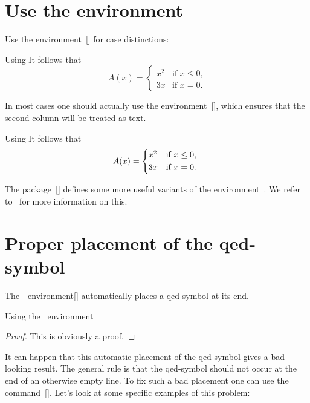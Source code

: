 \section{Use the  environment}

Use the environment~[\envname] for case distinctions:
\begin{showlatex}{Using }
It follows that
\[
  A(x)
  =
  \begin{cases}
    x^2  & \text{if $x \leq 0$,} \\
    3x   & \text{if $x = 0$.}
  \end{cases}
\]
\end{showlatex}
In most cases one should actually use the environment~[\envname], which ensures that the second column will be treated as text.
\begin{showlatex}{Using }
It follows that
\[
  A(x)
  =
  \begin{cases*}
    x^2  & if $x \leq 0$, \\
    3x   & if $x = 0$.
  \end{cases*}
\]
\end{showlatex}

The package~[\packname] defines some more useful variants of the environment~.
We refer to~\cite[3.4.3]{mathtools} for more information on this.




\section{Proper placement of the qed-symbol}


The~~environment[\envname] automatically places a qed-symbol at its end.
\begin{showlatex}{Using the ~environment}
\begin{proof}
This is obviously a proof.
\end{proof}
\end{showlatex}
It can happen that this automatic placement of the qed-symbol gives a bad looking result.
The general rule is that the qed-symbol should not occur at the end of an otherwise empty line.
To fix such a bad placement one can use the command~[\comname].
Let’s look at some specific examples of this problem:

